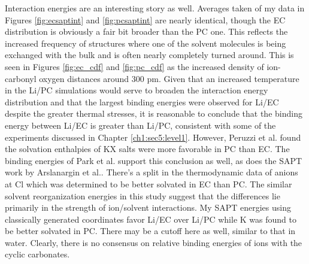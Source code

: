 \begin{ecpc}
   Interaction energies are an interesting story as well. Averages taken of my data in Figures \ref{fig:ecsaptint} and \ref{fig:pcsaptint} are nearly identical, though the EC distribution
   is obviously a fair bit broader than the PC one. This reflects the increased frequency of structures where one of the solvent molecules is being exchanged with the bulk and is often
   nearly completely turned around. This is seen in Figures \ref{fig:ec_cdf} and \ref{fig:pc_cdf} as the increased density of ion-carbonyl oxygen distances around 300 pm. Given that an
   increased temperature in the Li\sur{+}/PC simulations would serve to broaden the interaction energy distribution and that the largest binding energies were observed for Li\sur{+}/EC 
   despite the greater thermal stresses, it is reasonable to conclude that the binding energy between Li\sur{+}/EC is greater than Li\sur{+}/PC, consistent with some of the experiments 
   discussed in Chapter \ref{ch1:sec5:level1}. However, Peruzzi et al. found the solvation enthalpies of KX salts were more favorable in PC than EC. The binding energies of Park et al.
   support this conclusion as well\cite{park2011low}, as does the SAPT work by Arslanargin et al.\cite{ayse2016ecpc}. There's a split in the thermodynamic data of anions at Cl\sur{-}
   which was determined to be better solvated in EC than PC. The similar solvent reorganization energies in this study suggest that the differences lie primarily in the strength of 
   ion/solvent interactions. My SAPT energies using classically generated coordinates favor Li\sur{+}/EC over Li\sur{+}/PC while K\sur{+} was found to be better solvated in PC\cite{ayse2016ecpc}. 
   There may be a cutoff here as well, similar to that in water. Clearly, there is no consensus on relative binding energies of ions with the cyclic carbonates.
   

\end{ecpc}
